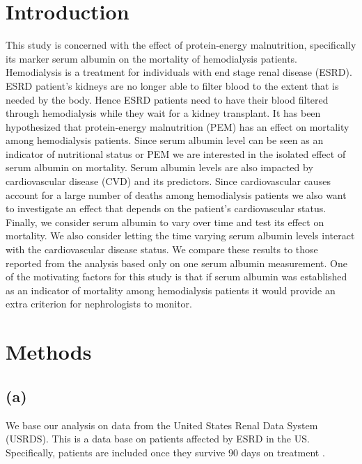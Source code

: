 \documentclass[paper=a4, fontsize=11pt]{scrartcl} %
\numberwithin{equation}{section} %
\numberwithin{figure}{section} %
\numberwithin{table}{section} %
\begin{document}
\section{Introduction}
This study is concerned with the effect of protein-energy malnutrition, specifically its marker serum albumin on the mortality of hemodialysis patients. Hemodialysis is a treatment for individuals with end stage renal disease (ESRD). ESRD patient's kidneys are no longer able to filter blood to the extent that is needed by the body. Hence ESRD patients need to have their blood filtered through hemodialysis while they wait for a kidney transplant.
It has been hypothesized that protein-energy malnutrition (PEM) has an effect on mortality among hemodialysis patients. Since serum albumin level can be seen as an indicator of nutritional status or PEM we are interested in the isolated effect of serum albumin on mortality.
Serum albumin levels are also impacted by cardiovascular disease (CVD) and its predictors. Since cardiovascular causes account for a large number of deaths among hemodialysis patients \cite{sukhuja} we also want to investigate an effect that depends on the patient's cardiovascular status. Finally, we consider serum albumin to vary over time and test its effect on mortality. We also consider letting the time varying serum albumin levels interact with the cardiovascular disease status. We compare these results to those reported from the analysis based only on one serum albumin measurement.
One of the motivating factors for this study is that if serum albumin was established as an indicator of mortality among hemodialysis patients it would provide an extra criterion for nephrologists to monitor.

\section{Methods}
\subsection{(a)}
We base our analysis on data from the United States Renal Data System (USRDS). This is a data base on patients affected by ESRD in the US. Specifically, patients are included once they survive 90 days on treatment \cite{dan}.
\end{document}
